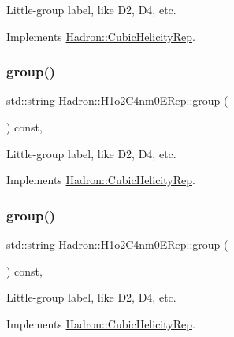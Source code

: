 Little-\/group label, like D2, D4, etc. 

Implements \mbox{\hyperlink{structHadron_1_1CubicHelicityRep_a101a7d76cd8ccdad0f272db44b766113}{Hadron\+::\+Cubic\+Helicity\+Rep}}.

\mbox{\label{structHadron_1_1H1o2C4nm0ERep_a36a640810282f46b74dffd59f917c4cd}} 
\subsubsection{\texorpdfstring{group()}{group()}\hspace{0.1cm}{\footnotesize\ttfamily [2/3]}}
{\footnotesize\ttfamily std\+::string Hadron\+::\+H1o2\+C4nm0\+E\+Rep\+::group (\begin{DoxyParamCaption}{ }\end{DoxyParamCaption}) const\hspace{0.3cm}{\ttfamily [inline]}, {\ttfamily [virtual]}}

Little-\/group label, like D2, D4, etc. 

Implements \mbox{\hyperlink{structHadron_1_1CubicHelicityRep_a101a7d76cd8ccdad0f272db44b766113}{Hadron\+::\+Cubic\+Helicity\+Rep}}.

\mbox{\label{structHadron_1_1H1o2C4nm0ERep_a36a640810282f46b74dffd59f917c4cd}} 
\subsubsection{\texorpdfstring{group()}{group()}\hspace{0.1cm}{\footnotesize\ttfamily [3/3]}}
{\footnotesize\ttfamily std\+::string Hadron\+::\+H1o2\+C4nm0\+E\+Rep\+::group (\begin{DoxyParamCaption}{ }\end{DoxyParamCaption}) const\hspace{0.3cm}{\ttfamily [inline]}, {\ttfamily [virtual]}}

Little-\/group label, like D2, D4, etc. 

Implements \mbox{\hyperlink{structHadron_1_1CubicHelicityRep_a101a7d76cd8ccdad0f272db44b766113}{Hadron\+::\+Cubic\+Helicity\+Rep}}.

